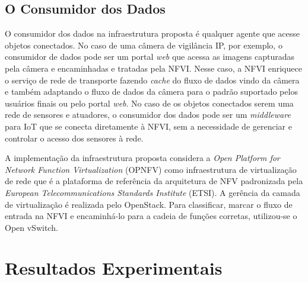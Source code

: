 \documentclass[12pt]{article}
\begin{document}
\subsection{O Consumidor dos Dados}

O consumidor dos dados na infraestrutura proposta é qualquer agente que acesse objetos conectados. No caso de uma câmera de vigilância IP, por exemplo, o consumidor de dados pode ser um portal {\it web} que acessa as imagens capturadas pela câmera e encaminhadas e tratadas pela NFVI. Nesse caso, a NFVI enriquece o serviço de rede de transporte fazendo \textit{cache} do fluxo de dados vindo da câmera e também adaptando o fluxo de dados da câmera para o padrão suportado pelos usuários finais ou pelo portal {\it web}. No caso de os objetos conectados serem uma rede de sensores e atuadores, o consumidor dos dados pode ser um {\it middleware} para IoT que se conecta diretamente à NFVI, sem a necessidade de gerenciar e controlar o acesso dos sensores à rede.

A implementação da infraestrutura proposta considera a \textit{Open Platform for Network Function Virtualization} (OPNFV)
como infraestrutura de virtualização de rede que é a plataforma de referência da arquitetura de NFV padronizada pela {\it European Telecommunications Standards Institute} (ETSI). A gerência da camada de virtualização é realizada pelo OpenStack.
Para classificar, marcar o fluxo de entrada na NFVI e encaminhá-lo para a cadeia de funções corretas, utilizou-se o Open vSwitch.

\section{Resultados Experimentais}
\label{sec:results}
\end{document}

